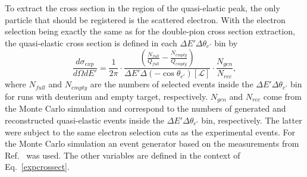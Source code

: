 To extract the cross section in the region of the quasi-elastic peak, the only particle that should be registered is the scattered electron. With the electron selection being exactly the same as for the double-pion cross section extraction, the quasi-elastic cross section is defined in each $\Delta E' \Delta \theta_{e'}$ bin by \vspace{-1.25em}
\begin{equation}
\frac{d\sigma_{exp}}{d\Omega dE'} = \frac{1}{2\pi} \cdot \frac{\left (\frac{N_{full}}{Q_{full}} - \frac{N_{empty}}{Q_{empty}} \right )}{\Delta E' \Delta(-\cos\theta_{e'}) [\mathcal{L}]} \cdot \frac{N_{gen}}{N_{rec}},\label{eq:my_xsect}
\end{equation}
where $N_{full}$ and $N_{empty}$ are the numbers of selected events inside the $\Delta E' \Delta \theta_{e'}$ bin for runs with deuterium and empty target, respectively. $N_{gen}$ and $N_{rec}$ come from the Monte Carlo simulation and correspond to the numbers of generated and reconstructed quasi-elastic events inside the $\Delta E' \Delta \theta_{e'}$ bin, respectively. The latter were subject to the same electron selection cuts as the experimental events. For the Monte Carlo simulation an event generator based on the measurements from Ref.~\cite{Osipenko:2005gt} was used. The other variables are defined in the context of Eq.~\eqref{expcrossect}.


